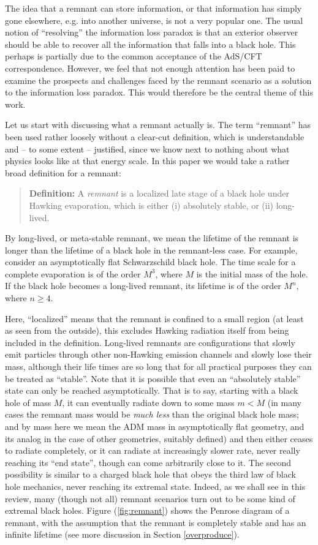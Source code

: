 \documentclass[12pt]{article}
\newcommand{\2}{$^2$}
\newcommand{\3}{$^3$}
\newcommand{\4}{$_4$}
\newcommand{\5}{$_5$}
\begin{document}
The idea that a remnant can store information, or that information has simply gone elsewhere, e.g. into another universe, is not a very popular one. The usual notion of ``resolving'' the information loss paradox is that an exterior observer should be able to recover all the information that falls into a black hole. This perhaps is partially due to the common acceptance of the AdS/CFT correspondence. However, we feel that not enough attention has been paid to examine the prospects and challenges faced by the remnant scenario as a solution to the information loss paradox. This would therefore be the central theme of this work.

Let us start with discussing what a remnant actually is.
The term ``remnant'' has been used rather loosely without a clear-cut definition, which is understandable and -- to some extent -- justified, since we know next to nothing about what physics looks like at that energy scale. In this paper we would take a rather broad definition for a remnant: 
\begin{quote}
\textbf{Definition:} A \emph{remnant} is a localized late stage of a black hole under Hawking evaporation, which is either (i) absolutely stable, or (ii) long-lived.
\end{quote}
By long-lived, or meta-stable remnant, we mean the lifetime of the remnant is longer than the lifetime of a black hole in the remnant-less case. For example, consider an asymptotically flat Schwarzschild black hole. 
The time scale for a complete evaporation is of the order $M^3$, where $M$ is the initial mass of the hole. If the black hole becomes a long-lived remnant, its lifetime is of the order $M^n$, where $n \geqslant 4$.

Here, ``localized'' means that the remnant is confined to a small region (at least as seen from the outside), this excludes Hawking radiation itself from being included in the definition.
Long-lived remnants are configurations that slowly emit particles through other non-Hawking emission channels and slowly lose their mass, although their life times are so long that for all practical purposes they can be treated as ``stable''.
Note that it is possible that even an ``absolutely stable'' state can only be reached asymptotically. 
That is to say, starting with a black hole of mass $M$, it can eventually radiate down to some mass $m < M$ (in many cases the remnant mass would be \emph{much less} than the original black hole mass; and by mass here we mean the ADM mass in asymptotically flat geometry, and its analog in the case of other geometries, suitably defined) and then either ceases to radiate completely, or it can radiate at increasingly slower rate, never really reaching its ``end state'', though can come arbitrarily close to it. The second possibility is similar to a charged black hole that obeys the third law of black hole mechanics, never reaching its extremal state. Indeed, as we shall see in this review, many (though not all) remnant scenarios turn out to be some kind of extremal black holes. Figure (\ref{fig:remnant}) shows the Penrose diagram of a remnant, with the assumption that the remnant is completely stable and has an infinite lifetime (see more discussion in Section \ref{overproduce}).
\end{document}
